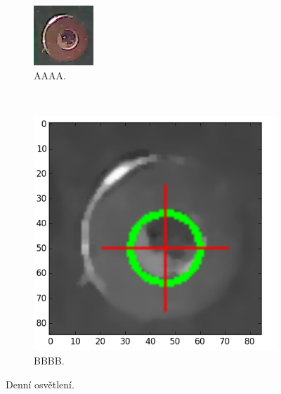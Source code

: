 \begin{figure}[h!]
	\centering
	\begin{subfigure}[b]{0.4\textwidth}
		\centering
		\includegraphics[width=0.4\linewidth, trim = 0cm -1.5cm 0cm 0cm]{obrazky/fiduc_denni_crop.png}%
		\caption{AAAA.}
		\label{fig:denni}
	\end{subfigure}
	~
	\begin{subfigure}[b]{0.4\textwidth}
		\centering
		\includegraphics[width=0.9\linewidth]{obrazky/fiduc_denni_crop3.png}%
		\caption{BBBB.}
		\label{fig:denni2}
	\end{subfigure}

	\caption{Denní osvětlení.}
\end{figure}


